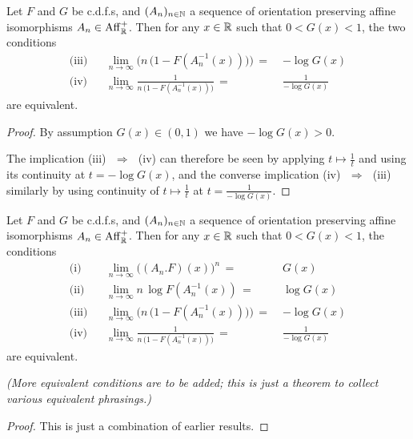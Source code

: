 \begin{lemma}
  \label{lem:inv-taylored-ev-limit}
  \leanok
  Let $F$ and $G$ be c.d.f.s, and $(A_n)_{n \in \mathbb{N}}$ a sequence of orientation
  preserving affine isomorphisms $A_n \in \mathrm{Aff}^+_{\mathbb{R}}$. Then for any $x \in \mathbb{R}$
  such that $0 < G(x) < 1$, the two conditions
  \begin{align*}
    \text{(iii)} & & \lim_{n \to \infty} \Big( n \, \big(1 - F (A_n^{-1}(x)) \big) \Big)
      \, = \; & - \log G(x) \\
    \text{(iv)} & & \lim_{n \to \infty} \frac{1}{n \, \big(1 - F (A_n^{-1}(x)) \big)}
      \, = \; & \frac{1}{-\log G(x)}
  \end{align*}
  are equivalent.
\end{lemma}
\begin{proof}
  \leanok
  By assumption $G(x) \in (0,1)$ we have $-\log G(x) > 0$.

  The implication {(iii)~$\,\Rightarrow \,$~(iv)}
  can therefore be seen by applying $t \mapsto \frac{1}{t}$
  and using its continuity at $t = -\log G(x)$, and the
  converse implication {(iv)~$\,\Rightarrow \,$~(iii)} similarly by using continuity of
  $t \mapsto \frac{1}{t}$ at $t = \frac{1}{-\log G(x)}$.
\end{proof}

\begin{theorem}
  \label{thm:tfae-ev-limit}
  \leanok
  Let $F$ and $G$ be c.d.f.s, and $(A_n)_{n \in \mathbb{N}}$ a sequence of orientation
  preserving affine isomorphisms $A_n \in \mathrm{Aff}^+_{\mathbb{R}}$. Then for any $x \in \mathbb{R}$
  such that $0 < G(x) < 1$, the conditions
  \begin{align*}
    \text{(i)} & & \lim_{n \to \infty} \big( (A_n.F)(x) \big)^n \, = \; & G(x) \\
    \text{(ii)} & & \lim_{n \to \infty} n \, \log F (A_n^{-1}(x)) \, = \; & \log G(x) \\
    \text{(iii)} & & \lim_{n \to \infty} \Big( n \, \big(1 - F (A_n^{-1}(x)) \big) \Big)
      \, = \; & - \log G(x) \\
    \text{(iv)} & & \lim_{n \to \infty} \frac{1}{n \, \big(1 - F (A_n^{-1}(x)) \big)}
      \, = \; & \frac{1}{-\log G(x)}
  \end{align*}
  are equivalent.

  \emph{(More equivalent conditions are to be added; this is just a theorem to collect
  various equivalent phrasings.)}
\end{theorem}
\begin{proof}
  \leanok
  This is just a combination of earlier results.
\end{proof}

